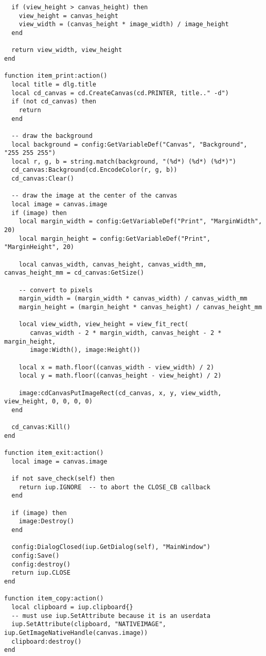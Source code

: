 \documentclass{ctexart}
\begin{document}
\begin{lstlisting}
  if (view_height > canvas_height) then 
    view_height = canvas_height
    view_width = (canvas_height * image_width) / image_height
  end
  
  return view_width, view_height
end

function item_print:action()
  local title = dlg.title
  local cd_canvas = cd.CreateCanvas(cd.PRINTER, title.." -d")
  if (not cd_canvas) then
    return
  end

  -- draw the background 
  local background = config:GetVariableDef("Canvas", "Background", "255 255 255")
  local r, g, b = string.match(background, "(%d*) (%d*) (%d*)")
  cd_canvas:Background(cd.EncodeColor(r, g, b))
  cd_canvas:Clear()

  -- draw the image at the center of the canvas
  local image = canvas.image
  if (image) then
    local margin_width = config:GetVariableDef("Print", "MarginWidth", 20)
    local margin_height = config:GetVariableDef("Print", "MarginHeight", 20)

    local canvas_width, canvas_height, canvas_width_mm, canvas_height_mm = cd_canvas:GetSize()

    -- convert to pixels
    margin_width = (margin_width * canvas_width) / canvas_width_mm
    margin_height = (margin_height * canvas_height) / canvas_height_mm

    local view_width, view_height = view_fit_rect(
       canvas_width - 2 * margin_width, canvas_height - 2 * margin_height, 
       image:Width(), image:Height())

    local x = math.floor((canvas_width - view_width) / 2)
    local y = math.floor((canvas_height - view_height) / 2)

    image:cdCanvasPutImageRect(cd_canvas, x, y, view_width, view_height, 0, 0, 0, 0)
  end

  cd_canvas:Kill()
end

function item_exit:action()
  local image = canvas.image

  if not save_check(self) then
    return iup.IGNORE  -- to abort the CLOSE_CB callback
  end

  if (image) then
    image:Destroy()
  end
  
  config:DialogClosed(iup.GetDialog(self), "MainWindow")
  config:Save()
  config:destroy()
  return iup.CLOSE
end

function item_copy:action()
  local clipboard = iup.clipboard{}
  -- must use iup.SetAttribute because it is an userdata
  iup.SetAttribute(clipboard, "NATIVEIMAGE", iup.GetImageNativeHandle(canvas.image))
  clipboard:destroy()
end


\end{lstlisting}
\end{document}
